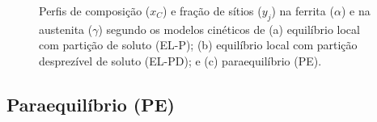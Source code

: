 \begin{figure}
  \hspace{1.5cm}
  \vspace{0pt}
  \caption{Perfis de composição ($x_C$) e fração de sítios ($y_j$) na ferrita ($\alpha$) e na austenita ($\gamma$) segundo os modelos cinéticos de (a) equilíbrio local com partição de soluto (EL-P); (b) equilíbrio local com partição desprezível de soluto (EL-PD); e (c) paraequilíbrio (PE).}
  \label{fig:modcineticos}
\end{figure}

\subsection{Paraequilíbrio (PE)}

